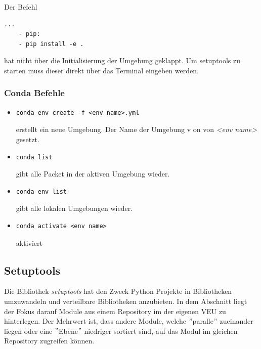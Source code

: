 Der Befehl 
\begin{lstlisting}[style=Config, caption={Beispiel Nicht übergebener Befehl}, captionpos=b]
	...
	- pip:
	- pip install -e .
\end{lstlisting}

hat nicht über die Initialisierung der Umgebung geklappt. Um setuptools zu starten muss dieser direkt über das Terminal eingeben werden.


\subsubsection{Conda Befehle}
\begin{itemize}
	\item 
	\begin{lstlisting}[style=CMD]
		conda env create -f <env name>.yml
	\end{lstlisting}
	erstellt ein neue Umgebung. Der Name der Umgebung v on von \textit{<env name>} gesetzt. 
	\item 	\begin{lstlisting}[style=CMD]
		conda list
	\end{lstlisting} gibt alle Packet in der aktiven Umgebung wieder.
	\item 	\begin{lstlisting}[style=CMD]
		conda env list
	\end{lstlisting}  gibt alle lokalen Umgebungen wieder.
	\item 	\begin{lstlisting}[style=CMD]
		conda activate <env name>
	\end{lstlisting}  aktiviert
\end{itemize}

\subsection{Setuptools}
Die Bibliothek \textit{setuptools} hat den Zweck Python Projekte in Bibliotheken umzuwandeln und verteilbare Bibliotheken anzubieten. In dem Abschnitt liegt der Fokus darauf Module aus einem Repository im der eigenen \gls{VEU} zu hinterlegen. Der Mehrwert ist, dass andere Module, welche $"$paralle$"$ zueinander liegen oder eine $"$Ebene$"$ niedriger sortiert sind, auf das Modul im gleichen Repository zugreifen können. \\


